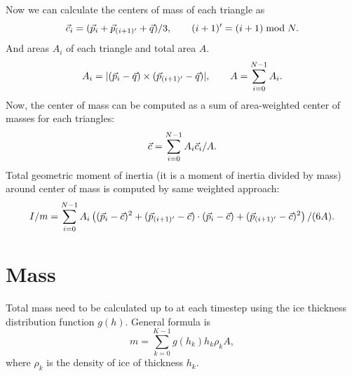 Now we can calculate the centers of mass of each triangle as
\begin{equation}
  {{\vec{c}}}_i = ( {{\vec{p}}}_i + {{\vec{p}}}_{(i+1)'} + {{\vec{q}}} ) / 3, \qquad
  (i+1)' = (i+1)\bmod N.
\end{equation}
And areas $A_i$ of each triangle and total area $A$.
\begin{equation}
  A_i = |({{\vec{p}}}_i - {{\vec{q}}})\times ({{\vec{p}}}_{(i+1)'} -
  {{\vec{q}}})|,\qquad
  A = \sum_{i=0}^{N-1} A_i.
\end{equation}
Now, the center of mass can be computed as a sum of area-weighted
center of masses for each triangles:
\begin{equation}
  {{\vec{c}}} = \sum_{i=0}^{N-1} A_i{{\vec{c}}}_i / A.
\end{equation}
Total geometric moment of inertia (it is a moment of inertia divided
by mass) around center of mass is computed by same weighted approach:
\begin{equation}
  I/m = \sum_{i=0}^{N-1} A_i \left( ({{\vec{p}}}_i-{{\vec{c}}})^2 + 
  ({{\vec{p}}}_{(i+1)'}-{{\vec{c}}})\cdot ({{\vec{p}}}_i-{{\vec{c}}}) +
  ({{\vec{p}}}_{(i+1)'}-{{\vec{c}}})^2\right ) / (6A).
\end{equation}

\section{Mass}

Total mass need to be calculated up to at each timestep using the ice
thickness distribution function $g(h)$. General formula is
\begin{equation}
  m = \sum_{k=0}^{K-1} g(h_k) h_k\rho_k A,
\end{equation}
where $\rho_k$ is the density of ice of thickness $h_k$.
